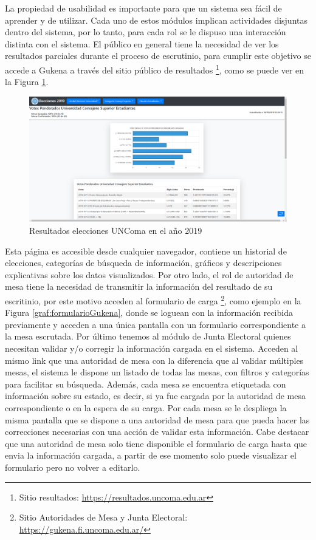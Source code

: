 La propiedad de usabilidad es importante para que un sistema sea fácil de aprender y de utilizar. Cada uno de estos módulos implican actividades disjuntas dentro del sistema, por lo tanto, para cada rol se le dispuso una interacción distinta con el sistema. \newline
El público en general tiene la necesidad de ver los resultados parciales durante el proceso de escrutinio, para cumplir este objetivo se accede a Gukena a través del sitio público de resultados \footnote{Sitio resultados: \url{https://resultados.uncoma.edu.ar}}, como se puede ver en la Figura \ref{graf:gukena2019}.

\begin{figure}[h!]
  \includegraphics[width=\textwidth]{img/1meeWrkwp4.png}
  \caption{Resultados elecciones UNComa en el año 2019}
  \label{graf:gukena2019}
\end{figure}

Esta página es accesible desde cualquier navegador, contiene un historial de elecciones, categorías de búsqueda de información, gráficos y descripciones explicativas sobre los datos visualizados. Por otro lado, el rol de autoridad de mesa tiene la necesidad de transmitir la información del resultado de su escritinio, por este motivo acceden al formulario de carga \footnote{Sitio Autoridades de Mesa y Junta Electoral: \url{https://gukena.fi.uncoma.edu.ar/}}, como ejemplo en la Figura \ref{graf:formularioGukena},
donde se loguean con la información recibida previamente y acceden a una única pantalla con un formulario correspondiente a la mesa escrutada. Por último tenemos al módulo de Junta Electoral quienes necesitan validar y/o corregir la información cargada en el sistema. Acceden al mismo link que una autoridad de mesa con la diferencia que al validar múltiples mesas, el sistema le dispone un listado de todas las mesas, con filtros y categorías para facilitar su búsqueda. Además, cada mesa se encuentra etiquetada con información sobre su estado, es decir, si ya fue cargada por la autoridad de mesa correspondiente o en la espera de su carga. Por cada mesa se le despliega la misma pantalla que se dispone a una autoridad de mesa para que pueda hacer las correcciones necesarias con una acción de validar esta información. \newline
Cabe destacar que una autoridad de mesa solo tiene disponible el formulario de carga hasta que envia la información cargada, a partir de ese momento solo puede visualizar el formulario pero no volver a editarlo.\newline 

